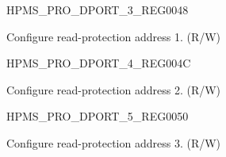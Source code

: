 \begin{register}{H}{PMS\_PRO\_DPORT\_3\_REG}{\hexprefix{}0048}\label{regdesc:PMSPRODPORT3REG}
%
%
\regnewline%
\begin{regdesc}\begin{reglist}
\label{fielddesc:PMSPRODPORTRESERVEFIFO1}\item [PMS\_PRO\_DPORT\_RESERVE\_FIFO\_1] Configure read-protection address 1. (R/W)
\end{reglist}\end{regdesc}
\end{register}


\begin{register}{H}{PMS\_PRO\_DPORT\_4\_REG}{\hexprefix{}004C}\label{regdesc:PMSPRODPORT4REG}
%
%
\regnewline%
\begin{regdesc}\begin{reglist}
\label{fielddesc:PMSPRODPORTRESERVEFIFO2}\item [PMS\_PRO\_DPORT\_RESERVE\_FIFO\_2] Configure read-protection address 2. (R/W)
\end{reglist}\end{regdesc}
\end{register}


\begin{register}{H}{PMS\_PRO\_DPORT\_5\_REG}{\hexprefix{}0050}\label{regdesc:PMSPRODPORT5REG}
%
%
\regnewline%
\begin{regdesc}\begin{reglist}
\label{fielddesc:PMSPRODPORTRESERVEFIFO3}\item [PMS\_PRO\_DPORT\_RESERVE\_FIFO\_3] Configure read-protection address 3. (R/W)
\end{reglist}\end{regdesc}
\end{register}


